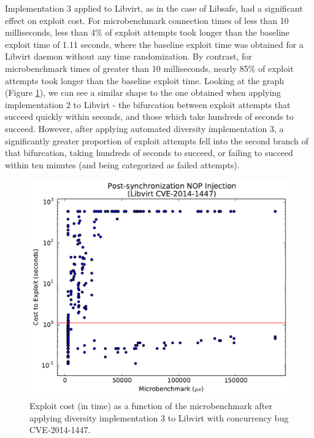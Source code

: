 Implementation 3 applied to Libvirt, as in the case of Libsafe, had a significant effect on exploit cost.
For microbenchmark connection times of less than 10 milliseconds, less than 4\% of exploit attempts took longer than the baseline exploit time of 1.11 seconds, where the baseline exploit time was obtained for a Libvirt daemon without any time randomization.
By contrast, for microbenchmark times of greater than 10 milliseconds, nearly 85\% of exploit attempts took longer than the baseline exploit time.
Looking at the graph (Figure \ref{fig_libvirt-post}), we can see a similar shape to the one obtained when applying implementation 2 to Libvirt - the bifurcation between exploit attempts that succeed quickly within seconds, and those which take hundreds of seconds to succeed.
However, after applying automated diversity implementation 3, a significantly greater proportion of exploit attempts fell into the second branch of that bifurcation, taking hundreds of seconds to succeed, or failing to succeed within ten minutes (and being categorized as failed attempts).
\begin{figure}
	\centering
	\includegraphics[width=\columnwidth]{figures/libvirt-post}
\caption{Exploit cost (in time) as a function of the microbenchmark after applying diversity implementation 3 to Libvirt with concurrency bug CVE-2014-1447.}
	\label{fig_libvirt-post}
\end{figure}

